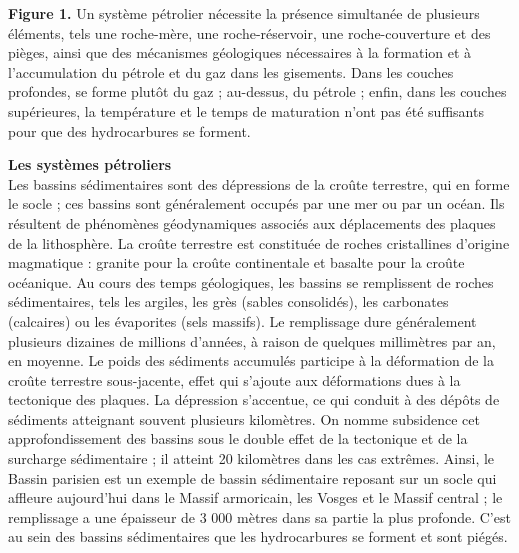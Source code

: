 \documentclass[8pt]{article}
\begin{document}
\begin{tcolorbox}[colback=white]
	\begin{center}
	\end{center}
	\textbf{Figure 1.} Un système pétrolier nécessite la présence simultanée de plusieurs éléments, tels une roche-mère, une roche-réservoir, une
	roche-couverture et des pièges, ainsi que des mécanismes géologiques
	nécessaires à la formation et à l’accumulation du pétrole et du gaz
	dans les gisements. Dans les couches profondes, se forme plutôt du
	gaz ; au-dessus, du pétrole ; enfin, dans les couches supérieures, la
	température et le temps de maturation n’ont pas été suffisants pour
	que des hydrocarbures se forment.
\end{tcolorbox}

\textbf{Les systèmes pétroliers}\\

Les bassins sédimentaires sont des dépressions de la croûte terrestre, qui en forme le socle ; ces bassins sont généralement occupés par une mer ou par un océan. Ils résultent de phénomènes géodynamiques associés aux déplacements des plaques de la lithosphère. La croûte terrestre est constituée de roches cristallines d'origine magmatique : granite pour la croûte continentale et basalte pour la croûte océanique. Au cours des temps géologiques, les bassins se remplissent de roches sédimentaires, tels les argiles, les grès (sables consolidés), les carbonates (calcaires) ou les évaporites (sels massifs). Le remplissage dure généralement plusieurs dizaines de millions d'années, à raison de quelques millimètres par an, en moyenne. Le poids des sédiments accumulés participe à la déformation de la croûte terrestre sous-jacente, effet qui s'ajoute aux déformations dues à la tectonique des plaques. La dépression s'accentue, ce qui conduit à des dépôts de sédiments atteignant souvent plusieurs kilomètres. On nomme subsidence cet approfondissement des bassins sous le double effet de la tectonique et de la surcharge sédimentaire ; il atteint 20 kilomètres dans les cas extrêmes. Ainsi, le Bassin parisien est un exemple de bassin sédimentaire reposant sur un socle qui affleure aujourd'hui dans le Massif armoricain, les Vosges et le Massif central ; le remplissage a une épaisseur de 3 000 mètres dans sa partie la plus profonde. C'est au sein des bassins sédimentaires que les hydrocarbures se forment et sont piégés.\\
\end{document}
